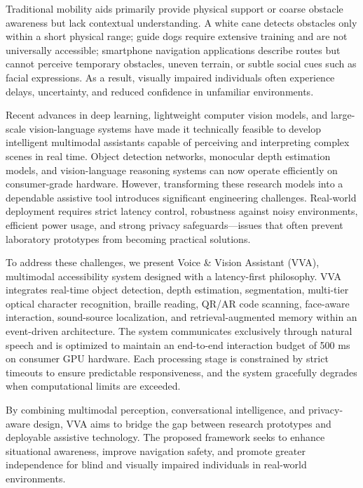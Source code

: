 Traditional mobility aids primarily provide physical support or coarse obstacle awareness but lack contextual understanding. A white cane detects obstacles only within a short physical range; guide dogs require extensive training and are not universally accessible; smartphone navigation applications describe routes but cannot perceive temporary obstacles, uneven terrain, or subtle social cues such as facial expressions. As a result, visually impaired individuals often experience delays, uncertainty, and reduced confidence in unfamiliar environments.

Recent advances in deep learning, lightweight computer vision models, and large-scale vision-language systems have made it technically feasible to develop intelligent multimodal assistants capable of perceiving and interpreting complex scenes in real time. Object detection networks, monocular depth estimation models, and vision-language reasoning systems can now operate efficiently on consumer-grade hardware. However, transforming these research models into a dependable assistive tool introduces significant engineering challenges. Real-world deployment requires strict latency control, robustness against noisy environments, efficient power usage, and strong privacy safeguards—issues that often prevent laboratory prototypes from becoming practical solutions.

To address these challenges, we present Voice \& Vision Assistant (VVA), multimodal accessibility system designed with a latency-first philosophy. VVA integrates real-time object detection, depth estimation, segmentation, multi-tier optical character recognition, braille reading, QR/AR code scanning, face-aware interaction, sound-source localization, and retrieval-augmented memory within an event-driven architecture. The system communicates exclusively through natural speech and is optimized to maintain an end-to-end interaction budget of 500 ms on consumer GPU hardware. Each processing stage is constrained by strict timeouts to ensure predictable responsiveness, and the system gracefully degrades when computational limits are exceeded.

By combining multimodal perception, conversational intelligence, and privacy-aware design, VVA aims to bridge the gap between research prototypes and deployable assistive technology. The proposed framework seeks to enhance situational awareness, improve navigation safety, and promote greater independence for blind and visually impaired individuals in real-world environments.

